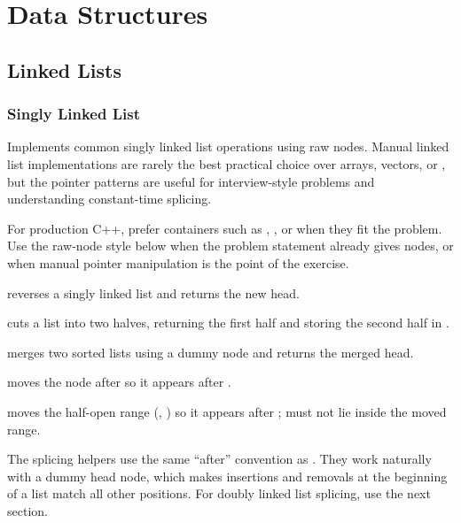 \chapter{\texorpdfstring{Data Structures}{2. Data Structures}}

\section{\texorpdfstring{Linked Lists}{2.1 Linked Lists}}
\setcounter{section}{1}
\setcounter{subsection}{0}
\subsection{Singly Linked List}
\label{sec:2.1.1}
Implements common singly linked list operations using raw nodes. Manual linked list implementations are rarely the best practical choice over arrays, vectors, or , but the pointer patterns are useful for interview-style problems and understanding constant-time splicing.

For production C++, prefer containers such as , , or  when they fit the problem. Use the raw-node style below when the problem statement already gives nodes, or when manual pointer manipulation is the point of the exercise.

\begin{compactitem}
  \item {} reverses a singly linked list and returns the new head.
  \item {} cuts a list into two halves, returning the first half and storing the second half in .
  \item {} merges two sorted lists using a dummy node and returns the merged head.
  \item {} moves the node after  so it appears after .
  \item {} moves the half-open range (, ) so it appears after ;  must not lie inside the moved range.
\end{compactitem}

The splicing helpers use the same ``after'' convention as . They work naturally with a dummy head node, which makes insertions and removals at the beginning of a list match all other positions. For doubly linked list splicing, use the next section.

